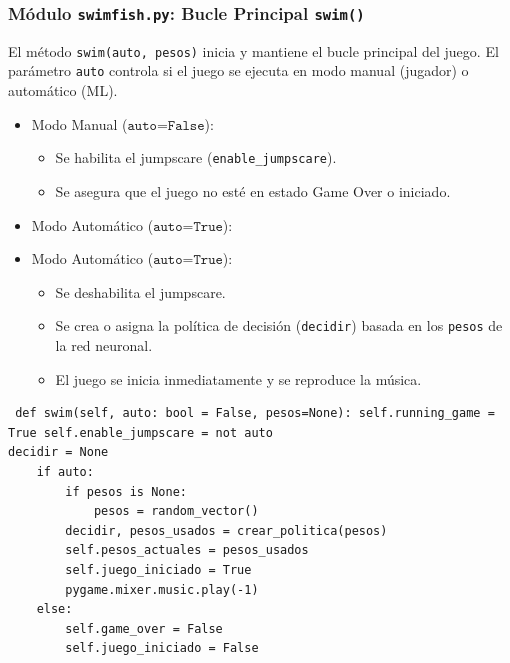 \documentclass[
	11pt, %
]{beamer}
\begin{document}
\begin{frame}[fragile]\frametitle{Módulo \texttt{swimfish.py}: Bucle Principal \texttt{swim()}}

El método \texttt{swim(auto, pesos)} inicia y mantiene el bucle principal del juego. El parámetro \texttt{auto} controla si el juego se ejecuta en modo manual (jugador) o automático (ML).

\begin{itemize}\item Modo Manual ($\texttt{auto=False}$):\begin{itemize}\item Se habilita el jumpscare (\texttt{enable_jumpscare}).\item Se asegura que el juego no esté en estado Game Over o iniciado.\end{itemize}\item Modo Automático ($\texttt{auto=True}$):
\item Modo Automático ($\texttt{auto=True}$):
\begin{itemize}
\item Se deshabilita el jumpscare.
\item Se crea o asigna la política de decisión (\texttt{decidir}) basada en los \texttt{pesos} de la red neuronal.

\item El juego se inicia inmediatamente y se reproduce la música.
    \end{itemize}

\end{itemize}

\vspace{4pt} {\scriptsize \begin{verbatim} def swim(self, auto: bool = False, pesos=None): self.running_game = True self.enable_jumpscare = not auto
decidir = None
    if auto:
        if pesos is None:
            pesos = random_vector()
        decidir, pesos_usados = crear_politica(pesos)
        self.pesos_actuales = pesos_usados
        self.juego_iniciado = True
        pygame.mixer.music.play(-1)
    else:
        self.game_over = False
        self.juego_iniciado = False
\end{verbatim} } \end{frame}
\end{document}
